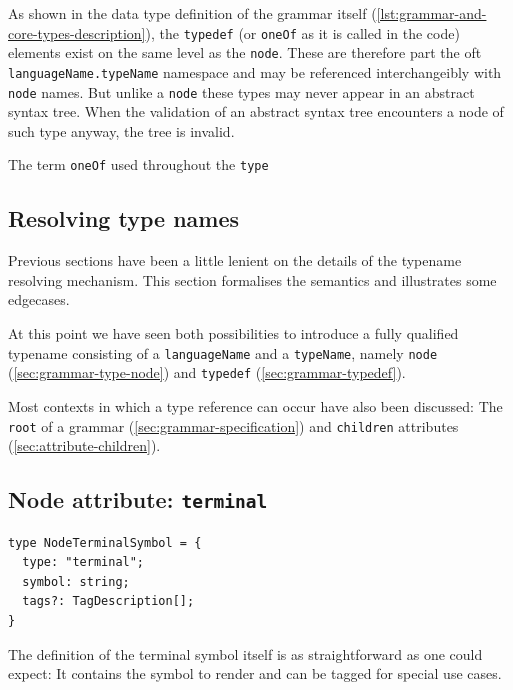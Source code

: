 \documentclass[]{report}
\begin{document}
As shown in the data type definition of the grammar itself (\cref{lst:grammar-and-core-types-description}), the \texttt{typedef} (or \texttt{oneOf} as it is called in the code) elements exist on the same level as the \texttt{node}. These are therefore part the oft \texttt{languageName.typeName} namespace and may be referenced interchangeibly with \texttt{node} names. But unlike a \texttt{node} these types may never appear in an abstract syntax tree. When the validation of an abstract syntax tree encounters a node of such type anyway, the tree is invalid.

The term \texttt{oneOf} used throughout the \texttt{type}

\subsection{Resolving type names}
\label{sec:resolving-typenames}

Previous sections have been a little lenient on the details of the typename resolving mechanism. This section formalises the semantics and illustrates some edgecases.

At this point we have seen both possibilities to introduce a fully qualified typename consisting of a \texttt{languageName} and a \texttt{typeName}, namely \texttt{node} (\cref{sec:grammar-type-node}) and \texttt{typedef} (\cref{sec:grammar-typedef}).

Most contexts in which a type reference can occur have also been discussed: The \texttt{root} of a grammar (\cref{sec:grammar-specification}) and \texttt{children} attributes (\cref{sec:attribute-children}).


\subsection{Node attribute: \texttt{terminal}}
\begin{listing}[H]
\begin{verbatim}
type NodeTerminalSymbol = {
  type: "terminal";
  symbol: string;
  tags?: TagDescription[];
}
\end{verbatim}
\caption{Type definition of \texttt{terminal} specification}
\label{lst:grammar-terminal-description}
\end{listing}

The definition of the terminal symbol itself is as straightforward as one could expect: It contains the symbol to render and can be tagged for special use cases.
\end{document}
